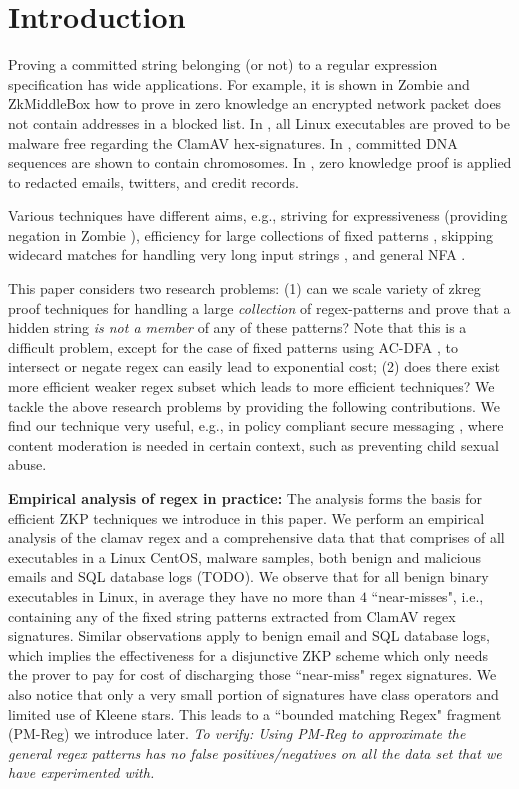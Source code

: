 \section{Introduction}
Proving a committed string belonging (or not) to a regular expression
specification has wide applications. For example, it is shown
in Zombie \cite{Zombie23} and ZkMiddleBox \cite{ZkMiddleBox}
how to prove in zero knowledge an encrypted network packet
does not contain addresses in a blocked list. In \cite{Zkreg}, 
all Linux executables are proved to be
malware free regarding the ClamAV hex-signatures.  
In \cite{Reef}, committed DNA sequences are shown to contain
chromosomes. In \cite{zkemail}, zero knowledge proof is
applied to redacted emails, twitters, and credit records.


Various techniques have different aims, e.g., striving for
expressiveness (providing negation in Zombie \cite{Zombie23}), 
efficiency for large collections of fixed patterns  \cite{Zkreg},
skipping widecard matches for handling very long input strings \cite{Reef},
and general NFA \cite{Luo23}. 

This paper considers two research problems: (1) can we
scale variety of zkreg proof techniques for handling a large
{\em collection} of regex-patterns and prove that a hidden string
{\em is not a member} of any of these patterns? 
Note that this is a difficult problem,
except for the case of fixed patterns using AC-DFA \cite{Zkreg}, 
to intersect or negate regex can easily lead to exponential cost; 
(2) does there exist more efficient weaker regex subset
which leads to more efficient techniques?
We tackle the above research problems by providing the
following contributions.
We find our technique very useful, e.g., in policy compliant
secure messaging \cite{alwen2025policy}, where content
moderation is needed in certain context, such as preventing child sexual abuse.

{\bf Empirical analysis of regex in practice:} 
The analysis forms the basis for efficient ZKP techniques we 
introduce in this paper. 
We perform an empirical analysis of the clamav regex 
and a comprehensive data that that comprises of
all executables in a Linux CentOS, malware samples,
both benign and malicious emails and SQL database logs (TODO).
We observe that for all benign binary executables in Linux, 
in average they have no more than $4$ ``near-misses", i.e., containing
any of the fixed string patterns extracted from ClamAV regex signatures.
Similar observations apply to benign email and SQL database logs,
which implies the effectiveness for a disjunctive ZKP scheme
which only needs the prover to pay for cost of discharging
those ``near-miss" regex signatures.
We also notice that only a very small portion of signatures have class operators
and limited use of Kleene stars. This leads to a 
``bounded matching Regex" fragment (PM-Reg) we introduce later.
{\em To verify:
Using PM-Reg to approximate the general regex patterns
has no false positives/negatives on all the data set that we 
have experimented with.}

